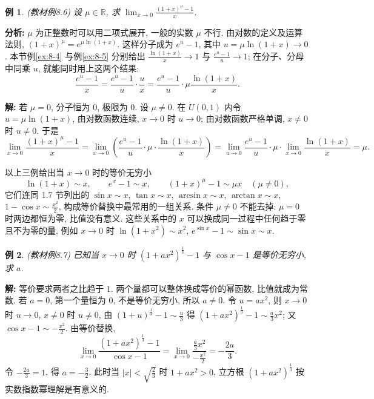 \documentclass[UTF8,openany]{ctexbook}
\theoremstyle{chinesetextbook}
\newtheorem{example}{例}[section]
\newenvironment{cnsolution}{\par\indent\textbf{解:} \ignorespaces}{\par}
\begin{document}
\begin{example}\label{ex:8-6}
\textnormal{(教材例8.6)} 设 $\mu\in\mathbb R$, 求 $\displaystyle\lim_{x\to0}\frac{(1+x)^\mu-1}x$.
\end{example}
\par\indent\textbf{分析:} $\mu$ 为正整数时可以用二项式展开, 一般的实数 $\mu$ 不行. 由对数的定义及运算法则, $(1+x)^\mu=e^{\mu\ln(1+x)}$. 这样分子成为 $e^u-1$, 其中 $u=\mu\ln(1+x)\to0$. 本节例\ref{ex:8-4} 与例\ref{ex:8-5} 分别给出 $\displaystyle\frac{\ln(1+x)}x\to1$ 与 $\displaystyle\frac{e^u-1}u\to1$; 在分子、分母中同乘 $u$, 就能同时用上这两个结果:
\[
\frac{e^u-1}x=\frac{e^u-1}u\cdot\frac ux=\frac{e^u-1}u\cdot\mu\frac{\ln(1+x)}x.
\]
\begin{cnsolution}
若 $\mu=0$, 分子恒为 $0$, 极限为 $0$. 设 $\mu\ne0$. 在 $\mathring U(0,1)$ 内令 $u=\mu\ln(1+x)$, 由对数函数连续, $x\to0$ 时 $u\to0$; 由对数函数严格单调, $x\ne0$ 时 $u\ne0$. 于是
\[
\lim_{x\to0}\frac{(1+x)^\mu-1}x=\lim_{x\to0}\left(\frac{e^u-1}u\cdot\mu\cdot\frac{\ln(1+x)}x\right)=\lim_{u\to0}\frac{e^u-1}u\cdot\mu\cdot\lim_{x\to0}\frac{\ln(1+x)}x=\mu.
\]
\end{cnsolution}
以上三例给出当 $x\to0$ 时的等价无穷小
\[
\ln(1+x)\sim x,\qquad e^x-1\sim x,\qquad(1+x)^\mu-1\sim\mu x\quad(\mu\ne0),
\]
它们连同 1.7 节列出的 $\sin x\sim x$, $\tan x\sim x$, $\arcsin x\sim x$, $\arctan x\sim x$, $\displaystyle1-\cos x\sim\frac{x^2}2$, 构成等价替换中最常用的一组关系. 条件 $\mu\ne0$ 不能去掉: $\mu=0$ 时两边都恒为零, 比值没有意义. 这些关系中的 $x$ 可以换成同一过程中任何趋于零且不为零的量, 例如 $x\to0$ 时 $\ln(1+x^2)\sim x^2$, $e^{\sin x}-1\sim\sin x\sim x$.
\begin{example}
\textnormal{(教材例8.7)} 已知当 $x\to0$ 时 $(1+ax^2)^{\frac13}-1$ 与 $\cos x-1$ 是等价无穷小, 求 $a$.
\end{example}
\begin{cnsolution}
等价要求两者之比趋于 $1$. 两个量都可以整体换成等价的幂函数, 比值就成为常数. 若 $a=0$, 第一个量恒为 $0$, 不是等价无穷小, 所以 $a\ne0$. 令 $u=ax^2$, 则 $x\to0$ 时 $u\to0$, $x\ne0$ 时 $u\ne0$, 由 $\displaystyle(1+u)^{\frac13}-1\sim\frac u3$ 得 $\displaystyle(1+ax^2)^{\frac13}-1\sim\frac a3x^2$; 又 $\displaystyle\cos x-1\sim-\frac{x^2}2$. 由等价替换,
\[
\lim_{x\to0}\frac{(1+ax^2)^{\frac13}-1}{\cos x-1}=\lim_{x\to0}\frac{\frac a3x^2}{-\frac{x^2}2}=-\frac{2a}3.
\]
令 $\displaystyle-\frac{2a}3=1$, 得 $\displaystyle a=-\frac32$. 此时当 $\displaystyle|x|<\sqrt{\frac23}$ 时 $1+ax^2>0$, 立方根 $(1+ax^2)^{\frac13}$ 按实数指数幂理解是有意义的.
\end{cnsolution}
\end{document}
